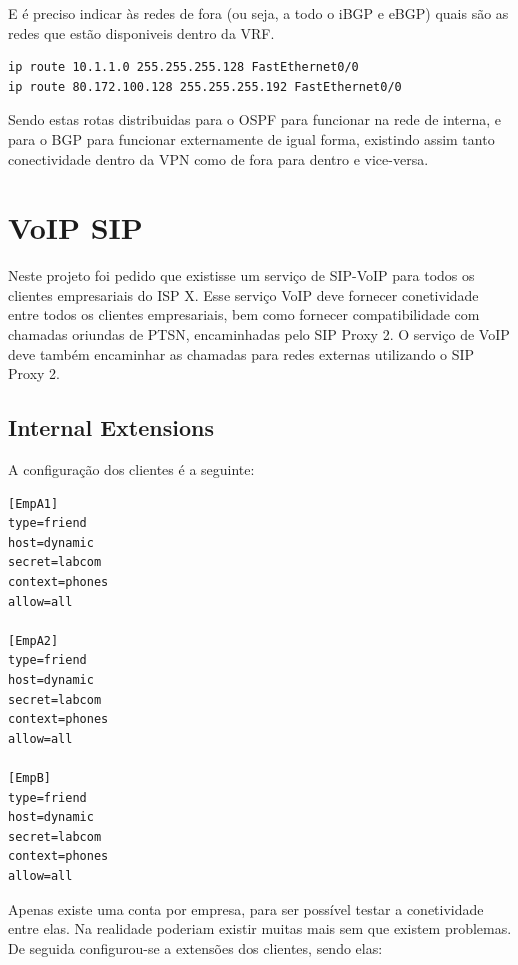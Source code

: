 \documentclass[11pt,a4paper]{report}
\begin{document}
E é preciso indicar às redes de fora (ou seja, a todo o iBGP e eBGP) quais são as redes que estão disponiveis dentro da VRF.\\

\begin{lstlisting}[caption=VPN - Anunciar rotas disponiveis dentro da VPN do lado de Aveiro]
ip route 10.1.1.0 255.255.255.128 FastEthernet0/0
ip route 80.172.100.128 255.255.255.192 FastEthernet0/0
\end{lstlisting}

Sendo estas rotas distribuidas para o OSPF para funcionar na rede de interna, e para o BGP para funcionar externamente de igual forma, existindo assim tanto conectividade dentro da VPN como de fora para dentro e vice-versa.

\chapter{VoIP SIP}

Neste projeto foi pedido que existisse um serviço de SIP-VoIP para todos os clientes empresariais do ISP X. Esse serviço VoIP deve fornecer conetividade entre todos os clientes empresariais, bem como fornecer compatibilidade com chamadas oriundas de PTSN, encaminhadas pelo SIP Proxy 2. O serviço de VoIP deve também encaminhar as chamadas para redes externas utilizando o SIP Proxy 2.

\section{Internal Extensions}

A configuração dos clientes é a seguinte:

\begin{lstlisting}[caption=SIP Proxy 1 - /etc/asterisk/sip.conf]
[EmpA1]
type=friend
host=dynamic
secret=labcom
context=phones
allow=all

[EmpA2]
type=friend
host=dynamic
secret=labcom
context=phones
allow=all

[EmpB]
type=friend
host=dynamic
secret=labcom
context=phones
allow=all
\end{lstlisting}

Apenas existe uma conta por empresa, para ser possível testar a conetividade entre elas. Na realidade poderiam existir muitas mais sem que existem problemas.\\

De seguida configurou-se a extensões dos clientes, sendo elas:
\end{document}
